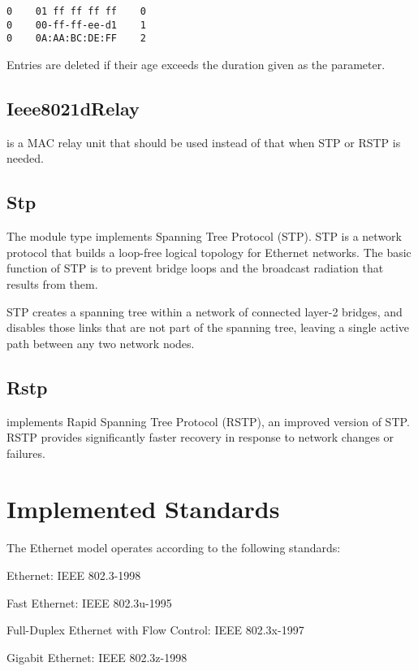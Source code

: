 \begin{verbatim}
0    01 ff ff ff ff    0
0    00-ff-ff-ee-d1    1
0    0A:AA:BC:DE:FF    2
\end{verbatim}

Entries are deleted if their age exceeds the duration given as the  parameter.


\subsection{Ieee8021dRelay}

 is a MAC relay unit that should be used instead
of  that when STP or RSTP is needed.

\subsection{Stp}

The  module type implements Spanning Tree Protocol (STP). STP
is a network protocol that builds a loop-free logical topology for Ethernet
networks. The basic function of STP is to prevent bridge loops and the broadcast
radiation that results from them.

STP creates a spanning tree within a network of connected layer-2 bridges, and
disables those links that are not part of the spanning tree, leaving a single
active path between any two network nodes.


\subsection{Rstp}

 implements Rapid Spanning Tree Protocol (RSTP), an improved
version of STP. RSTP provides significantly faster recovery in response to
network changes or failures.


\section{Implemented Standards}

The Ethernet model operates according to the following standards:

\begin{compactitem}
  \item Ethernet: IEEE 802.3-1998
  \item Fast Ethernet: IEEE 802.3u-1995
  \item Full-Duplex Ethernet with Flow Control: IEEE 802.3x-1997
  \item Gigabit Ethernet: IEEE 802.3z-1998
\end{compactitem}



